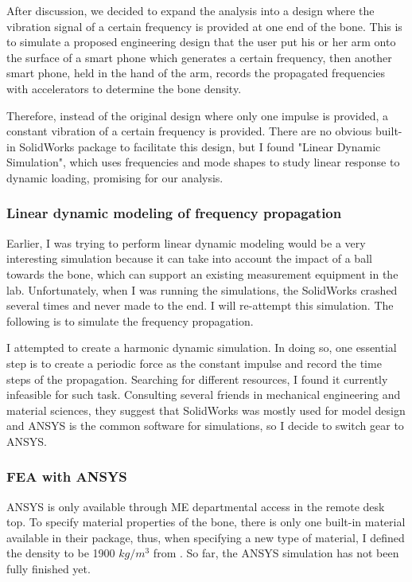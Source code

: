 \documentclass{sigchi}
\begin{document}
After discussion, we decided to expand the analysis into a design where the vibration signal of a certain frequency is provided at one end of the bone. This is to simulate a proposed engineering design that the user put his or her arm onto the surface of a smart phone which generates a certain frequency, then another smart phone, held in the hand of the arm, records the propagated frequencies with accelerators to determine the bone density.

Therefore, instead of the original design where only one impulse is provided, a constant vibration of a certain frequency is provided. There are no obvious built-in SolidWorks package to facilitate this design, but I found "Linear Dynamic Simulation", which uses frequencies and mode shapes to study linear response to dynamic loading, promising for our analysis.

\subsubsection{Linear dynamic modeling of frequency propagation} 

Earlier, I was trying to perform linear dynamic modeling would be a very interesting simulation because it can take into account the impact of a ball towards the bone, which can support an existing measurement equipment in the lab. Unfortunately, when I was running the simulations, the SolidWorks crashed several times and never made to the end. I will re-attempt this simulation. The following is to simulate the frequency propagation.

I attempted to create a harmonic dynamic simulation. In doing so, one essential step is to create a periodic force as the constant impulse and record the time steps of the propagation. Searching for different resources, I found it currently infeasible for such task. Consulting several friends in mechanical engineering and material sciences, they suggest that SolidWorks was mostly used for model design and ANSYS is the common software for simulations, so I decide to switch gear to ANSYS.

\subsubsection{FEA with ANSYS} 

ANSYS is only available through ME departmental access in the remote desk top. To specify material properties of the bone, there is only one built-in material available in their package, thus, when specifying a new type of material, I defined the density to be 1900 $kg/m^3$ from \cite{Cameron:1999:Physics}. So far, the ANSYS simulation has not been fully finished yet. 
\end{document}
